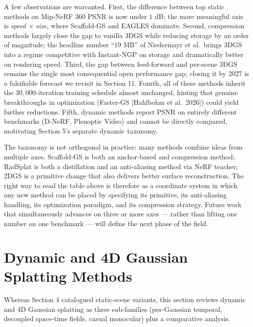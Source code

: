 A few observations are warranted. First, the difference between top static methods on Mip-NeRF 360 PSNR is now under \(1\) dB; the more meaningful axis is \emph{speed × size}, where Scaffold-GS and EAGLES dominate. Second, compression methods largely close the gap to vanilla 3DGS while reducing storage by an order of magnitude; the headline number ``\(19\) MB'' of Niedermayr et al.~brings 3DGS into a regime competitive with Instant-NGP on storage and dramatically better on rendering speed. Third, the gap between feed-forward and per-scene 3DGS remains the single most consequential open performance gap; closing it by 2027 is a falsifiable forecast we revisit in Section 11. Fourth, all of these methods inherit the \(30{,}000\)-iteration training schedule almost unchanged, hinting that genuine breakthroughs in optimization (Faster-GS {[}Hahlbohm et al.~2026{]}) could yield further reductions. Fifth, dynamic methods report PSNR on entirely different benchmarks (D-NeRF, Plenoptic Video) and cannot be directly compared, motivating Section 5's separate dynamic taxonomy.

The taxonomy is not orthogonal in practice: many methods combine ideas from multiple axes. Scaffold-GS is both an anchor-based and compression method; RadSplat is both a distillation and an anti-aliasing method via NeRF teacher; 2DGS is a primitive change that also delivers better surface reconstruction. The right way to read the table above is therefore as a coordinate system in which any new method can be placed by specifying its primitive, its anti-aliasing handling, its optimization paradigm, and its compression strategy. Future work that simultaneously advances on three or more axes --- rather than lifting one number on one benchmark --- will define the next phase of the field.

\section{Dynamic and 4D Gaussian Splatting Methods}\label{dynamic-and-4d-gaussian-splatting-methods}

Whereas Section 4 catalogued static-scene variants, this section reviews dynamic and 4D Gaussian splatting as three sub-families (per-Gaussian temporal, decoupled space-time fields, casual monocular) plus a comparative analysis.

